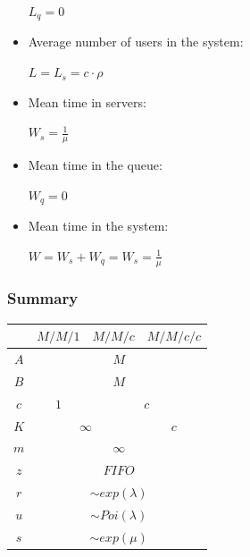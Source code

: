 \documentclass[
	12pt,
	twoside
]{book}
\begin{document}
\begin{itemize}
{		$
			L_q = 0
		$
	}
	\item {
		Average number of users in the system:

		$
			L = L_s = c \cdot \rho
		$
	}
	\item {
		Mean time in servers:

		$
			W_s = \frac {1} {\mu}
		$
	}
	\item {
		Mean time in the queue:

		$
			W_q = 0
		$
	}
	\item {
		Mean time in the system:

		$
			W =
			W_s + W_q =
			W_s =
			\frac {1} {\mu}
		$
	}
\end{itemize}

\subsubsection{Summary}

\begin{tabular}{|c|c|c|c|}
	\hline
	& $M/M/1$ & $M/M/c$ & $M/M/c/c$ \\
	\hline
	$A$ & \multicolumn{3}{c|}{$M$} \\
	\hline
	$B$ & \multicolumn{3}{c|}{$M$} \\
	\hline
	$c$ & $1$ & \multicolumn{2}{c|}{$c$} \\
	\hline
	$K$ & \multicolumn{2}{c|}{$\infty$} & $c$ \\
	\hline
	$m$ & \multicolumn{3}{c|}{$\infty$} \\
	\hline
	$z$ & \multicolumn{3}{c|}{$FIFO$} \\
	\hline
	$r$ & \multicolumn{3}{c|}{$\sim exp(\lambda)$} \\
	\hline
	$u$ & \multicolumn{3}{c|}{$\sim Poi(\lambda)$} \\
	\hline
	$s$ & \multicolumn{3}{c|}{$\sim exp(\mu)$} \\
	\hline
\end{tabular}
\end{document}
